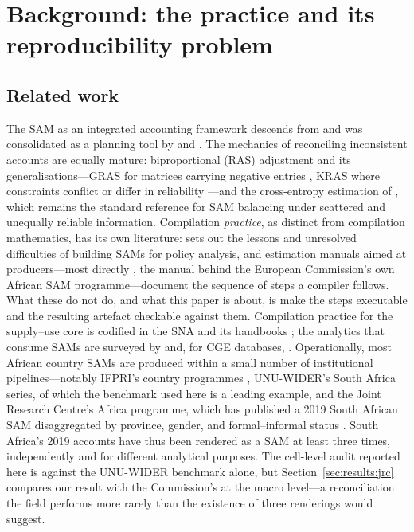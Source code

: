 \section{Background: the practice and its reproducibility problem}
\label{sec:related}

\subsection{Related work}

The SAM as an integrated accounting framework descends from
\citet{stone1962} and was consolidated as a planning tool by
\citet{pyattthorbecke1976} and \citet{pyattround1985}. The mechanics of
reconciling inconsistent accounts are equally mature: biproportional (RAS)
adjustment and its generalisations---GRAS for matrices carrying negative
entries \citep{junius2003,temurshoev2013}, KRAS where constraints
conflict or differ in reliability \citep{lenzen2009}---and the
cross-entropy estimation of \citet{robinson2001}, which remains the
standard reference for SAM balancing under scattered and unequally reliable
information. Compilation \emph{practice}, as distinct from compilation
mathematics, has its own literature: \citet{round2003} sets out the
lessons and unresolved difficulties of building SAMs for policy analysis,
and estimation manuals aimed at producers---most directly
\citet{mainar2018}, the manual behind the European Commission's own
African SAM programme---document the sequence of steps a compiler
follows. What these do not do, and what this paper is about, is make the
steps executable and the resulting artefact checkable against them.
Compilation practice for the supply--use core is codified in
the SNA and its handbooks \citep{un2009sna,un2018handbook,eurostat2008};
the analytics that consume SAMs are surveyed by \citet{millerblair2009}
and, for CGE databases, \citet{lofgren2002}. Operationally, most African
country SAMs are produced within a small number of institutional
pipelines---notably IFPRI's country programmes \citep{thurlow2021},
UNU-WIDER's South Africa series, of which the benchmark used here
\citep{vanseventer2023} is a leading example, and the Joint Research
Centre's Africa programme, which has published a 2019 South African SAM
disaggregated by province, gender, and formal--informal status
\citep{elmeligi2025}. South Africa's 2019 accounts have thus been
rendered as a SAM at least three times, independently and for different
analytical purposes. The cell-level audit reported here is against the
UNU-WIDER benchmark alone, but
Section~\ref{sec:results:jrc} compares our result with the Commission's
at the macro level---a reconciliation the field performs more rarely than
the existence of three renderings would suggest.

